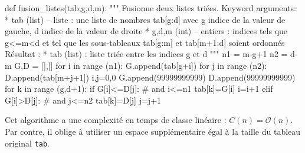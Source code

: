 \documentclass[10pt,fleqn]{article} %
\begin{document}
\begin{py}
\begin{python}
def fusion_listes(tab,g,d,m):
    """
    Fusionne deux listes triées.
    Keyword arguments:
     * tab (list) -- liste : une liste de nombres tab[g:d] avec g indice de la valeur de 
        gauche, d indice de la valeur de droite
     * g,d,m (int) -- entiers : indices tels que g<=m<d et tel que les sous-tableaux
        tab[g:m] et tab[m+1:d] soient ordonnés
    Résultat :
     * tab (list) : liste triée entre les indices 
       g et d
    """
    n1 = m-g+1
    n2 = d-m
    G,D = [],[]
    for i in range (n1):
        G.append(tab[g+i])
    for j in range (n2):
        D.append(tab[m+j+1])
    i,j=0,0
    G.append(99999999999)
    D.append(99999999999)
    for k in range (g,d+1):
        if G[i]<=D[j]: # and i<=n1 
            tab[k]=G[i]
            i=i+1
        elif G[i]>D[j]: # and j<=n2
            tab[k]=D[j]
            j=j+1
\end{python}
\end{py}

\begin{resultat}
Cet algorithme a une complexité en temps de classe linéaire : $C(n)=\mathcal{O}(n)$.
Par contre, il oblige à utiliser un espace supplémentaire égal à la taille du tableau original \texttt{tab}.
\end{resultat}
\end{document}
